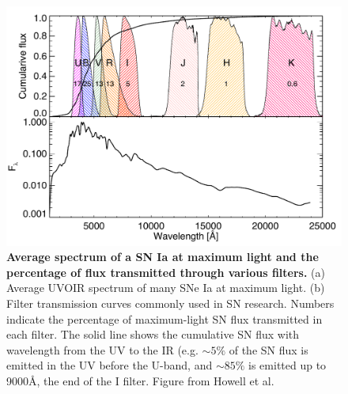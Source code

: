 \documentclass{nature1}
\begin{document}
\begin{figure}
\includegraphics[width=7in]{maxspec.pdf} 
\caption{\textsf{{\bf \textsf{Average spectrum of a SN Ia at maximum light and the
    percentage of flux transmitted through various filters.}} 
    (a) Average UVOIR spectrum of many SNe Ia at maximum
  light\citep{2007ApJ...663.1187H}.  (b) Filter transmission curves commonly used in SN research.  Numbers indicate the percentage of maximum-light SN flux transmitted in each filter.  The solid line shows the
  cumulative SN flux with wavelength from the UV to the IR (e.g. $\sim
  5\%$ of the SN flux is emitted in the UV before the U-band, and $\sim 85\%$ is emitted up to 9000\AA , the end of the I filter. Figure from Howell et al.\citep{2009ApJ...691..661H}}}
\label{maxspec}
\end{figure}
\end{document}
